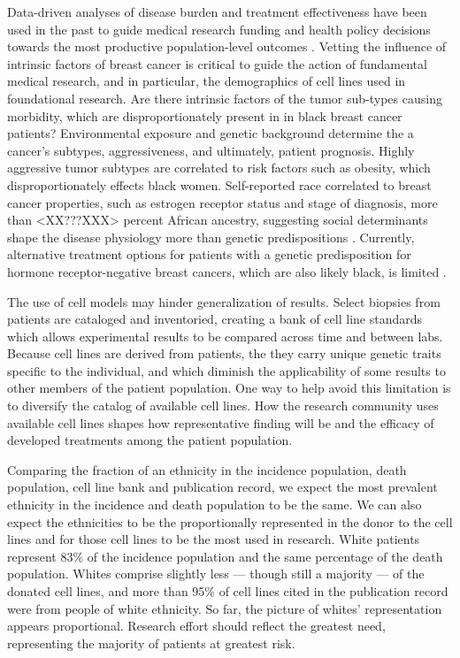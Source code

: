 \documentclass[11pt]{article}
\begin{document}
Data-driven analyses of disease burden and treatment effectiveness have been used in the past to guide medical research funding and health policy decisions towards the most productive population-level outcomes \cite{kim2016cancer}. Vetting the influence of intrinsic factors of breast cancer is critical to guide the action of fundamental medical research, and in particular, the demographics of cell lines used in foundational research. Are there intrinsic factors of the tumor sub-types causing morbidity, which are disproportionately present in in black breast cancer patients? Environmental exposure and genetic background determine the a cancer's subtypes, aggressiveness, and ultimately, patient prognosis. Highly aggressive tumor subtypes are correlated to risk factors such as obesity, which disproportionately effects black women. Self-reported race correlated to breast cancer properties, such as estrogen receptor status and stage of diagnosis, more than <XX???XXX> percent African ancestry, suggesting social determinants shape the disease physiology more than genetic predispositions \cite{reding2012examination}. Currently, alternative treatment options for patients with a genetic predisposition for hormone receptor-negative breast cancers, which are also likely black, is limited \cite{huo2009population}.

The use of cell models may hinder generalization of results. Select biopsies from patients are cataloged and inventoried, creating a bank of cell line standards which allows experimental results to be compared across time and between labs. Because cell lines are derived from patients, the they carry unique genetic traits specific to the individual, and which diminish the applicability of some results to other members of the patient population. One way to help avoid this limitation is to diversify the catalog of available cell lines. How the research community uses available cell lines shapes how representative finding will be and the efficacy of developed treatments among the patient population.  

Comparing the fraction of an ethnicity in the incidence population, death population, cell line bank and publication record, we expect the most prevalent ethnicity in the incidence and death population to be the same. We can also expect the ethnicities to be the proportionally represented in the donor to the cell lines and for those cell lines to be the most used in research. White patients represent 83\% of the incidence population and the same percentage of the death population. Whites comprise slightly less --- though still a majority --- of the donated cell lines, and more than 95\% of cell lines cited in the publication record were from people of white ethnicity. So far, the picture of whites' representation appears proportional. Research effort should reflect the greatest need, representing the majority of patients at greatest risk.%
\end{document}

